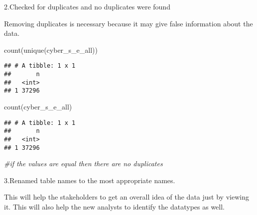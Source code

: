 \documentclass[
]{article}
\newenvironment{Shaded}{\begin{snugshade}}{\end{snugshade}}
\newcommand{\CommentTok}[1]{\textcolor[rgb]{0.56,0.35,0.01}{\textit{#1}}}
\newcommand{\FunctionTok}[1]{\textcolor[rgb]{0.00,0.00,0.00}{#1}}
\newcommand{\NormalTok}[1]{#1}
\begin{document}
\hfill\break
2.Checked for duplicates and no duplicates were found

Removing duplicates is necessary because it may give false information
about the data.

\begin{Shaded}
\begin{Highlighting}[]
\FunctionTok{count}\NormalTok{(}\FunctionTok{unique}\NormalTok{(cyber\_s\_e\_all))}
\end{Highlighting}
\end{Shaded}

\begin{verbatim}
## # A tibble: 1 x 1
##       n
##   <int>
## 1 37296
\end{verbatim}

\begin{Shaded}
\begin{Highlighting}[]
\FunctionTok{count}\NormalTok{(cyber\_s\_e\_all)}
\end{Highlighting}
\end{Shaded}

\begin{verbatim}
## # A tibble: 1 x 1
##       n
##   <int>
## 1 37296
\end{verbatim}

\begin{Shaded}
\begin{Highlighting}[]
\CommentTok{\#if the values are equal then there are no duplicates}
\end{Highlighting}
\end{Shaded}

\hfill\break
3.Renamed table names to the most appropriate names.

This will help the stakeholders to get an overall idea of the data just
by viewing it. This will also help the new analysts to identify the
datatypes as well.
\end{document}
